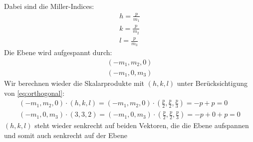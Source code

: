 \documentclass[11pt]{article}
\begin{document}
Dabei sind die Miller-Indices:
\begin{align*}
h = \frac{p}{m_1}\\
k = \frac{p}{m_2}\\
l = \frac{p}{m_3}
\end{align*}
Die Ebene wird aufgespannt durch:
 \begin{align*}
(-m_1,m_2,0)\\
(-m_1,0,m_3)
\end{align*}
Wir berechnen wieder die Skalarprodukte mit $(h,k,l)$ unter Berücksichtigung von \eqref{eq:orthogonal}:
\begin{align*}
(-m_1,m_2,0)\cdot(h,k,l)=(-m_1,m_2,0)\cdot\left(\frac{p}{2},\frac{p}{2},\frac{p}{3}\right)=-p+p=0\\
(-m_1,0,m_3)\cdot(3,3,2)=(-m_1,0,m_3)\cdot\left(\frac{p}{2},\frac{p}{2},\frac{p}{3}\right)=-p+0+p=0
\end{align*}
$(h,k,l)$ steht wieder senkrecht auf beiden Vektoren, die die Ebene aufspannen und somit auch senkrecht auf der Ebene
\end{document}
